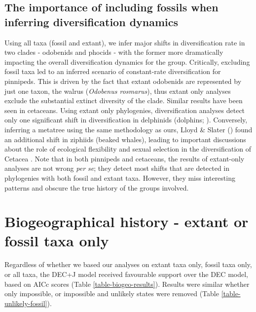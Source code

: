 \documentclass[a4paper, 12pt]{article}
\begin{document}
\subsection{The importance of including fossils when inferring diversification dynamics}

Using all taxa (fossil and extant), we infer major shifts in diversification rate in two clades - odobenids and phocids - with the former more dramatically impacting the overall diversification dynamics for the group. Critically, excluding fossil taxa led to an inferred scenario of constant-rate diversification for pinnipeds. This is driven by the fact that extant odobenids are represented by just one taxon, the walrus (\textit{Odobenus rosmarus}), thus extant only analyses exclude the substantial extinct diversity of the clade. Similar results have been seen in cetaceans. Using extant only phylogenies, diversification analyses detect only one significant shift in diversification in delphinids (dolphins; \citealt{rabosky2014automatic}). Conversely, inferring a metatree using the same methodology as ours, Lloyd \& Slater (\citeyear{lloyd2021total}) found an additional shift in ziphiids (beaked whales), leading to important discussions about the role of ecological flexibility and sexual selection in the diversification of Cetacea \citep{lloyd2021total}. Note that in both pinnipeds and cetaceans, the results of extant-only analyses are not wrong \textit{per se}; they detect most shifts that are detected in phylogenies with both fossil and extant taxa. However, they miss interesting patterns and obscure the true history of the groups involved.

\section{Biogeographical history - extant or fossil taxa only}

Regardless of whether we based our analyses on extant taxa only, fossil taxa only, or all taxa, the DEC+J model received favourable support over the DEC model, based on AICc scores (Table \ref{table-biogeo-results}). Results were similar whether only impossible, or impossible and unlikely states were removed (Table \ref{table-unlikely-fossil}).




\end{document}
